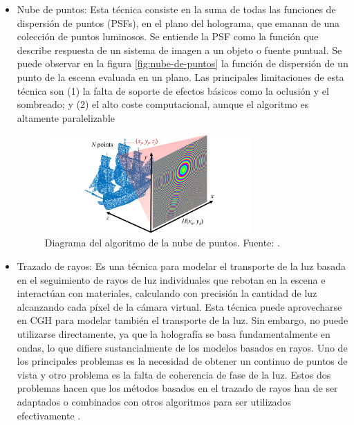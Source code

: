 \documentclass[10pt, a4paper]{article}
\begin{document}
\begin{itemize}
\item Nube de puntos: Esta técnica consiste en la suma de todas las funciones de dispersión de puntos (PSFs), en el plano del holograma, que emanan de una colección de puntos luminosos. Se entiende la PSF como la función que describe respuesta de un sistema de imagen a un objeto o fuente puntual. Se puede observar en la figura \autoref{fig:nube-de-puntos} la función de dispersión de un punto de la escena evaluada en un plano. Las principales limitaciones de esta técnica son (1) la falta de soporte de efectos básicos como la oclusión y el sombreado; y (2) el alto coste computacional, aunque el algoritmo es altamente paralelizable \cite{Blinder:2021}

\begin{figure}[H]
    \centering 
    \includegraphics[width=0.75\textwidth]{tecnica_nube_puntos}
    \caption{Diagrama del algoritmo de la nube de puntos. Fuente: \textcite{Blinder:2022}.}
    \label{fig:nube-de-puntos}
\end{figure}

\item Trazado de rayos: Es una técnica para modelar el transporte de la luz basada en el seguimiento de rayos de luz individuales que rebotan en la escena e interactúan con materiales, calculando con precisión la cantidad de luz alcanzando cada píxel de la cámara virtual. Esta técnica puede aprovecharse en CGH para modelar también el transporte de la luz. Sin embargo, no puede utilizarse directamente, ya que la holografía se basa fundamentalmente en ondas, lo que difiere sustancialmente de los modelos basados en rayos. Uno de los principales problemas es la necesidad de obtener un continuo de puntos de vista y otro problema es la falta de coherencia de fase de la luz. Estos dos problemas hacen que los métodos basados en el trazado de rayos han de ser adaptados o combinados con otros algoritmos para ser utilizados efectivamente \cite{Blinder:2022}.
\end{itemize}
\end{document}

